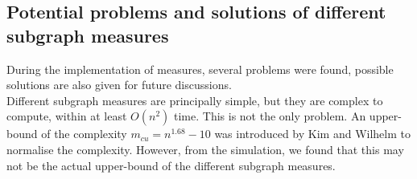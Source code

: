 \documentclass[12pt]{article}
\begin{document}
\subsection{Potential problems and solutions of different subgraph measures}
\label{problem}
During the implementation of measures, several problems were found, possible solutions are also given for future discussions.\\
Different subgraph measures are principally simple, but they are complex to compute, within at least $O(n^2)$ time\cite{KIM20082637}. This is not the only problem. An upper-bound of the complexity $m_{cu} = n^{1.68}-10$ was introduced by Kim and Wilhelm\cite{KIM20082637} to normalise the complexity. However, from the simulation, we found that this may not be the actual upper-bound of the different subgraph measures.
\end{document}
